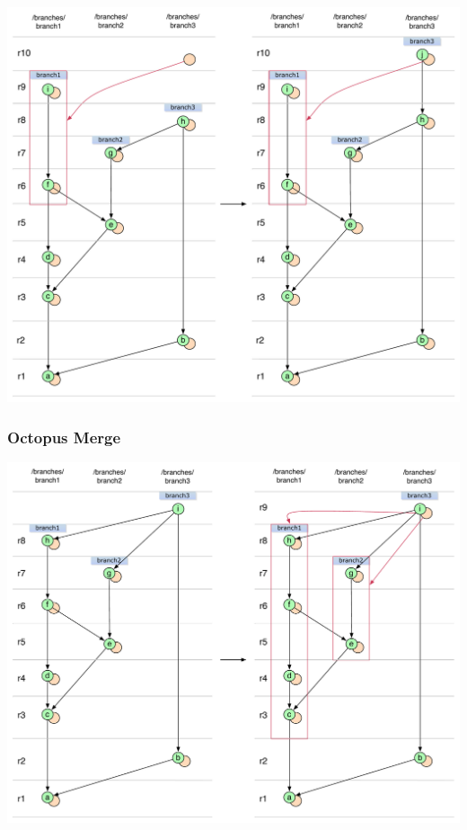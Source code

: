 \begin{center}
\includegraphics[width=\textwidth]{img/diagrams/no_merge_commit_cherry_pick_sequence_svn_to_git.pdf}%
\label{no_merge_commit_cherry_pick_sequence_svn_to_git}%
\end{center}

\subsubsection{Octopus Merge}

\begin{center}
\includegraphics[width=\textwidth]{img/diagrams/octopus_merge_git_to_svn.pdf}%
\label{octopus_merge_git_to_svn}%
\end{center}

